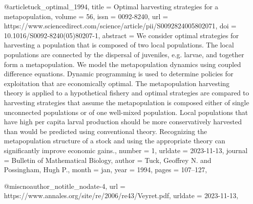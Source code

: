 {@article{tuck_optimal_1994,
	title = {Optimal harvesting strategies for a metapopulation},
	volume = {56},
	issn = {0092-8240},
	url = {https://www.sciencedirect.com/science/article/pii/S0092824005802071},
	doi = {10.1016/S0092-8240(05)80207-1},
	abstract = {We consider optimal strategies for harvesting a population that is composed of two local populations. The local populations are connected by the dispersal of juveniles, e.g. larvae, and together form a metapopulation. We model the metapopulation dynamics using coupled difference equations. Dynamic programming is used to determine policies for exploitation that are economically optimal. The metapopulation harvesting theory is applied to a hypothetical fishery and optimal strategies are compared to harvesting strategies that assume the metapopulation is composed either of single unconnected populations or of one well-mixed population. Local populations that have high per capita larval production should be more conservatively harvested than would be predicted using conventional theory. Recognizing the metapopulation structure of a stock and using the appropriate theory can significantly improve economic gains.},
	number = {1},
	urldate = {2023-11-13},
	journal = {Bulletin of Mathematical Biology},
	author = {Tuck, Geoffrey N. and Possingham, Hugh P.},
	month = jan,
	year = {1994},
	pages = {107--127},
}

@misc{noauthor_notitle_nodate-4,
	url = {https://www.annales.org/site/re/2006/re43/Veyret.pdf},
	urldate = {2023-11-13},
}

}
